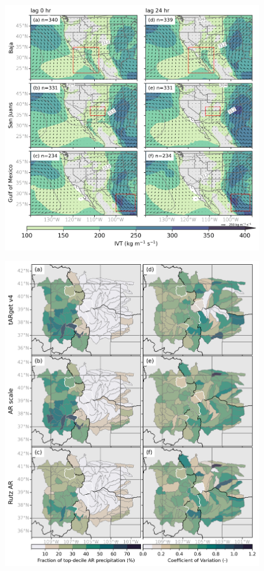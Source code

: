 \documentclass[draft]{agujournal2019}
\begin{document}
\begin{figure}
\noindent\includegraphics[width=\textwidth]{fig8.png}
\label{fig:composites_MJJASO}
\caption{}
\end{figure}

\begin{figure}
\noindent\includegraphics[width=\textwidth]{fig9.png}
\label{fig:anom_composites_NDJFMA}
\caption{}
\end{figure}
\end{document}
